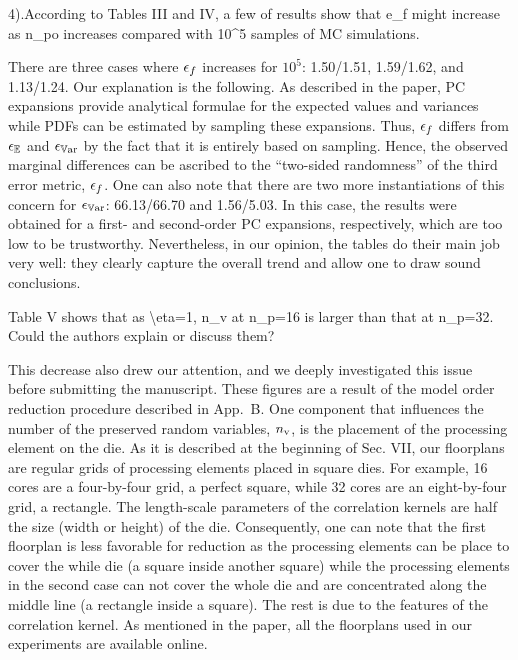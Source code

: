 \begin{authors}
\end{authors}

\begin{reviewer}
4).According to Tables III and IV, a few of results show that e\_f might increase as n\_po increases compared with 10\^{}5 samples of MC simulations.
\end{reviewer}
\begin{authors}
There are three cases where $\epsilon_f$ increases for $10^5$: 1.50/1.51, 1.59/1.62, and 1.13/1.24.
Our explanation is the following.
As described in the paper, PC expansions provide analytical formulae for the expected values and variances while PDFs can be estimated by sampling these expansions.
Thus, $\epsilon_f$ differs from $\epsilon_\mathbb{E}$ and $\epsilon_{\mathbb{V}\text{ar}}$ by the fact that it is entirely based on sampling.
Hence, the observed marginal differences can be ascribed to the ``two-sided randomness'' of the third error metric, $\epsilon_f$.
One can also note that there are two more instantiations of this concern for $\epsilon_{\mathbb{V}\text{ar}}$: 66.13/66.70 and 1.56/5.03.
In this case, the results were obtained for a first- and second-order PC expansions, respectively, which are too low to be trustworthy.
Nevertheless, in our opinion, the tables do their main job very well: they clearly capture the overall trend and allow one to draw sound conclusions.

\end{authors}

\begin{reviewer}
Table V shows that as \textbackslash{}eta=1, n\_v at n\_p=16 is larger than that at n\_p=32. Could the authors explain or discuss them?
\end{reviewer}
\begin{authors}
This decrease also drew our attention, and we deeply investigated this issue before submitting the manuscript.
These figures are a result of the model order reduction procedure described in App.~B.
One component that influences the number of the preserved random variables, ${n_\text{v}}$, is the placement of the processing element on the die.
As it is described at the beginning of Sec. VII, our floorplans are regular grids of processing elements placed in square dies.
For example, 16 cores are a four-by-four grid, a perfect square, while 32 cores are an eight-by-four grid, a rectangle.
The length-scale parameters of the correlation kernels are half the size (width or height) of the die.
Consequently, one can note that the first floorplan is less favorable for reduction as the processing elements can be place to cover the while die (a square inside another square) while the processing elements in the second case can not cover the whole die and are concentrated along the middle line (a rectangle inside a square).
The rest is due to the features of the correlation kernel.
As mentioned in the paper, all the floorplans used in our experiments are available online.

\end{authors}

